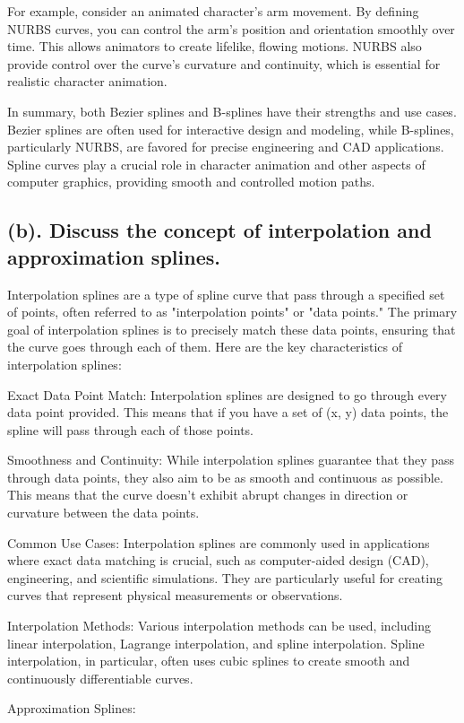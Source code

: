 \documentclass{article}
\begin{document}
\begin{itemize}
For example, consider an animated character's arm movement. By defining NURBS curves, you can control the arm's position and orientation smoothly over time. This allows animators to create lifelike, flowing motions. NURBS also provide control over the curve's curvature and continuity, which is essential for realistic character animation.

In summary, both Bezier splines and B-splines have their strengths and use cases. Bezier splines are often used for interactive design and modeling, while B-splines, particularly NURBS, are favored for precise engineering and CAD applications. Spline curves play a crucial role in character animation and other aspects of computer graphics, providing smooth and controlled motion paths.
\subsection{(b). Discuss the concept of interpolation and approximation splines.}
Interpolation splines are a type of spline curve that pass through a specified set of points, often referred to as "interpolation points" or "data points." The primary goal of interpolation splines is to precisely match these data points, ensuring that the curve goes through each of them. Here are the key characteristics of interpolation splines:

Exact Data Point Match: Interpolation splines are designed to go through every data point provided. This means that if you have a set of (x, y) data points, the spline will pass through each of those points.

Smoothness and Continuity: While interpolation splines guarantee that they pass through data points, they also aim to be as smooth and continuous as possible. This means that the curve doesn't exhibit abrupt changes in direction or curvature between the data points.

Common Use Cases: Interpolation splines are commonly used in applications where exact data matching is crucial, such as computer-aided design (CAD), engineering, and scientific simulations. They are particularly useful for creating curves that represent physical measurements or observations.

Interpolation Methods: Various interpolation methods can be used, including linear interpolation, Lagrange interpolation, and spline interpolation. Spline interpolation, in particular, often uses cubic splines to create smooth and continuously differentiable curves.

Approximation Splines:


\end{itemize}
\end{document}
